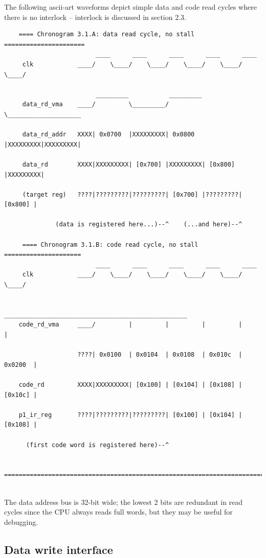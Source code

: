     The following ascii-art waveforms depict simple data and code read cycles
    where there is no interlock -- interlock is discussed in section 2.3.\\
    
\begin{verbatim}
    ==== Chronogram 3.1.A: data read cycle, no stall ======================
                         ____      ____      ____      ____      ____
     clk            ____/    \____/    \____/    \____/    \____/    \____/

                         _________           _________
     data_rd_vma    ____/         \_________/         \____________________

     data_rd_addr   XXXX| 0x0700  |XXXXXXXXX| 0x0800  |XXXXXXXXX|XXXXXXXXX|

     data_rd        XXXX|XXXXXXXXX| [0x700] |XXXXXXXXX| [0x800] |XXXXXXXXX|

     (target reg)   ????|?????????|?????????| [0x700] |?????????| [0x800] |

              (data is registered here...)--^    (...and here)--^

     ==== Chronogram 3.1.B: code read cycle, no stall =====================
                         ____      ____      ____      ____      ____
     clk            ____/    \____/    \____/    \____/    \____/    \____/

                         __________________________________________________
    code_rd_vma     ____/         |         |         |         |         |

                    ????| 0x0100  | 0x0104  | 0x0108  | 0x010c  | 0x0200  |

    code_rd         XXXX|XXXXXXXXX| [0x100] | [0x104] | [0x108] | [0x10c] |

    p1_ir_reg       ????|?????????|?????????| [0x100] | [0x104] | [0x108] |

      (first code word is registered here)--^

    ========================================================================
\end{verbatim}\\

    The data address bus is 32-bit wide; the lowest 2 bits are redundant in 
    read cycles since the CPU always reads full words, but they may be useful 
    for debugging.\\

\subsection{Data write interface}
\label{data_write_bus}

